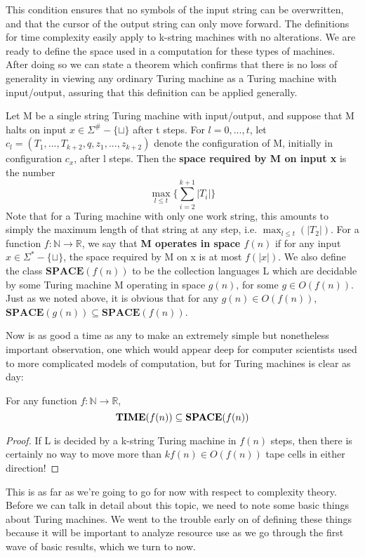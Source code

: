 This condition ensures that no symbols of the input string can be overwritten, and that the cursor of the output string can only move forward. 
The definitions for time complexity easily apply to k-string machines with no alterations. We are ready to define the space used in a computation for these types of machines. After doing so we can state a theorem which confirms that there is no loss of generality in viewing any ordinary Turing machine as a Turing machine with input/output, assuring that this definition can be applied generally.
\begin{definition}
Let M be a single string Turing machine with input/output, and suppose that M halts on input $x \in \Sigma^\#-\{\sqcup\}$ after t steps. For $l=0,...,t$, let $c_l = (T_1,...,T_{k+2},q,z_1,...,z_{k+2})$ denote the configuration of M, initially in configuration $c_x$, after l steps. Then the \textbf{space required by M on input x} is the number
\[\max_{l\leq t}\{\sum_{i=2}^{k+1}|T_i|\} \] 
Note that for a Turing machine with only one work string, this amounts to simply the maximum length of that string at any step, i.e. $\max_{l \leq t}(|T_2|)$. For a function $f:\mathbb{N}\to \mathbb{R}$, we say that \textbf{M operates in space $f(n)$} if for any input $x \in \Sigma^*-\{\sqcup\}$, the space required by M on x is at most $f(|x|)$. 
We also define the class $\bm{SPACE}(f(n))$ to be the collection languages L which are decidable by some Turing machine M operating in space $g(n)$, for some $g \in O(f(n))$. Just as we noted above, it is obvious that for any $g(n) \in O(f(n))$, $\bm{SPACE}(g(n)) \subseteq \bm{SPACE}(f(n))$.
\end{definition}
Now is as good a time as any to make an extremely simple but nonetheless important observation, one which would appear deep for computer scientists used to more complicated models of computation, but for Turing machines is clear as day:
\begin{fact}
For any function $f:\mathbb{N} \to \mathbb{R}$, 
\[\textrm{\textbf{TIME}}(f(n)) \subseteq \textrm{\textbf{SPACE}}(f(n)) \]
\end{fact}
\begin{proof}
If L is decided by a k-string Turing machine in $f(n)$ steps, then there is certainly no way to move more than $kf(n) \in O(f(n))$ tape cells in either direction!
\end{proof}
This is as far as we're going to go for now with respect to complexity theory. Before we can talk in detail about this topic, we need to note some basic things about Turing machines. We went to the trouble early on of defining these things because it will be important to analyze resource use as we go through the first wave of basic results, which we turn to now.

